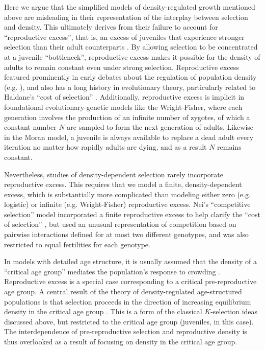 \documentclass[12pt]{article}
\begin{document}
Here we argue that the simplified models of density-regulated growth mentioned above are misleading in their representation of the interplay between selection and density. This ultimately derives from their failure to account for ``reproductive excess'', that is, an excess of juveniles that experience stronger selection than their adult counterparts \citep{turner1968population}. By allowing selection to be concentrated at a juvenile ``bottleneck'', reproductive excess makes it possible for the density of adults to remain constant even under strong selection. Reproductive excess featured prominently in early debates about the regulation of population density (e.g. \citealt{nicholson_1954}), and also has a long history in evolutionary theory, particularly related to Haldane's ``cost of selection'' \citep{haldane_1957,turner1968population}. Additionally, reproductive excess is implicit in foundational evolutionary-genetic models like the Wright-Fisher, where each generation involves the production of an infinite number of zygotes, of which a constant number $N$ are sampled to form the next generation of adults. Likewise in the Moran model, a juvenile is always available to replace a dead adult every iteration no matter how rapidly adults are dying, and as a result $N$ remains constant. 

Nevertheless, studies of density-dependent selection rarely incorporate reproductive excess. This requires that we model a finite, density-dependent excess, which is substantially more complicated than modeling either zero (e.g. logistic) or infinite (e.g. Wright-Fisher) reproductive excess. Nei's ``competitive selection'' model incorporated a finite reproductive excess to help clarify the ``cost of selection'' \citep{nei1971fertility,nagylaki_1992}, but used an unusual representation of competition based on pairwise interactions defined for at most two different genotypes, and was also restricted to equal fertilities for each genotype. 

In models with detailed age structure, it is usually assumed that the density of a ``critical age group'' mediates the population's response to crowding \citep[pp. 54]{charlesworth_1994}. Reproductive excess is a special case corresponding to a critical pre-reproductive age group. A central result of the theory of density-regulated age-structured populations is that selection proceeds in the direction of increasing equilibrium density in the critical age group \citep[pp. 148]{charlesworth_1994}. This is a form of the classical $K$-selection ideas discussed above, but restricted to the critical age group (juveniles, in this case). The interdependence of pre-reproductive selection and reproductive density is thus overlooked as a result of focusing on density in the critical age group. 
\end{document}
